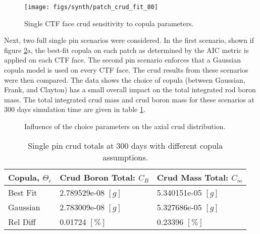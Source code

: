 \begin{figure}[H]
    \centering
    \texttt{[image: figs/synth/patch\_crud\_fit\_80]}
    \caption{Single CTF face crud sensitivity to copula parameters.}
    \label{fig:patchcrudfit80}
\end{figure}

Next, two full single pin scenarios were considered. In the first scenario, shown if figure \ref{fig:crud_copula_fam_sensi}a, the best-fit copula on each patch as determined by the AIC metric is applied on each CTF face.  The second pin scenario enforces that a Gaussian copula model is used on every CTF face.  The crud results from these scenarios were then compared.  The data shows the choice of copula (between Gaussian, Frank, and Clayton) has a small overall impact on the total integrated rod boron mass.   The total integrated crud mass and crud boron mass for these scenarios at 300 days simulation time are given in table \ref{tab:crud_totals_copula}.

\begin{figure}[H]%
    \centering
    \qquad
    \caption[]{Influence of the choice parameters on the axial crud distribution.}%
    \label{fig:crud_copula_fam_sensi}%
\end{figure}


\begin{table}[h]
    \begin{center}
        \caption[Crud totals with different copula assumptions.]{Single pin crud totals at 300 days with different copula assumptions.}
        \begin{tabular}[h]{|l | l | l |}
            \hline
            Copula, $\Theta_c$ & Crud Boron Total: $C_B$ & Crud Mass Total: $C_m$ \\
            \hline
            Best Fit &  2.789529e-08 $[g]$ & 5.340151e-05 $[g]$ \\
            Gaussian &  2.783009e-08 $[g]$ & 5.327686e-05 $[g]$ \\
            \hline
            Rel Diff &  0.01724 $[\%]$ & 0.23396 $[\%]$ \\
            \hline
        \end{tabular}
        \label{tab:crud_totals_copula}
    \end{center}
\end{table}

